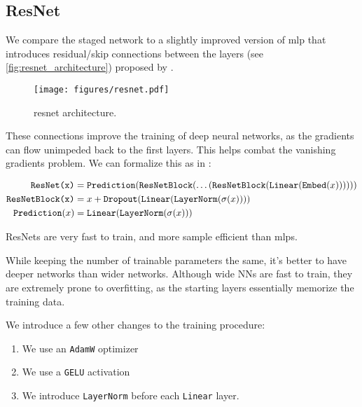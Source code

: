 \subsection{ResNet}
\label{sec:resnet}

We compare the staged network to a slightly improved version of \gls{mlp} that introduces residual/skip
connections between the layers (see \autoref{fig:resnet_architecture}) proposed by \cite{resnet}.

\begin{figure}[htb]
    \centering
    \texttt{[image: figures/resnet.pdf]}
    \caption[Resnet architecture]{\gls{resnet} architecture.}
    \label{fig:resnet_architecture}
\end{figure}

These connections improve the training of deep neural networks, as the gradients can flow unimpeded back to the first
layers. This helps combat the vanishing gradients problem. We can formalize this as in
\cite{ft-transformer}:


{\fontsize{11}{10}\selectfont
\begin{align}
    \texttt{ResNet(x)}      & = \texttt{Prediction}(\texttt{ResNetBlock}(\dots(\texttt{ResNetBlock}(\texttt{Linear}(\texttt{Embed}(x)))))) \\
    \texttt{ResNetBlock(x)} & = x + \texttt{Dropout}(\texttt{Linear}(\texttt{LayerNorm}(\sigma(x))))                                               \\
    \texttt{Prediction}(x)  & = \texttt{Linear}(\texttt{LayerNorm}(\sigma(x)))
\end{align}
}

ResNets are very fast to train, and more sample efficient than \glspl{mlp}.


While keeping the number of trainable parameters the same, it's better to have deeper networks than wider networks.
Although wide NNs are fast to train, they are extremely prone to overfitting, as the starting layers essentially
memorize the training data.


We introduce a few other changes to the training procedure:

\begin{enumerate}
    \item We use an \verb|AdamW| optimizer \cite{adamw}
    \item We use a \verb|GELU| activation \cite{gelu}
    \item We introduce \verb|LayerNorm| \cite{layernorm} before each \verb|Linear| layer.
\end{enumerate}
